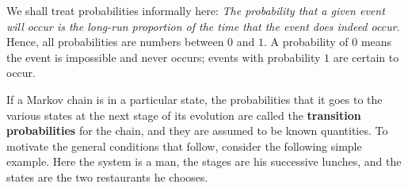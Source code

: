 \documentclass{ximera}
\begin{document}
We shall treat probabilities informally here: \textit{The probability that a given event will occur is the long-run proportion of the time that the event does indeed occur}. Hence, all probabilities are numbers between $0$ and $1$. A probability of $0$ means the event is impossible and never occurs; events with probability $1$ are certain to occur.


If a Markov chain is in a particular state, the probabilities that it goes to the various states at the next stage of its evolution are called the \textbf{transition probabilities} for the chain, and they are assumed to be known quantities. To motivate the general conditions that follow, consider the following simple example. Here the system is a man, the stages are his successive lunches, and the states are the two restaurants he chooses.
\end{document}
